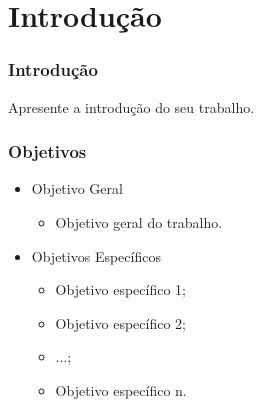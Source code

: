 \section{Introdução}

\begin{frame}

    \frametitle{Introdução}

    Apresente a introdução do seu trabalho.

\end{frame}


\begin{frame}

    \frametitle{Objetivos}

    \begin{itemize}
    
        \item Objetivo Geral
            \begin{itemize}
                \item Objetivo geral do trabalho.
            \end{itemize}
            
        \item Objetivos Específicos
            \begin{itemize}
                \item Objetivo específico 1;
                \item Objetivo específico 2;
                \item ...;
                \item Objetivo específico n.
            \end{itemize}
            
    \end{itemize}

\end{frame}